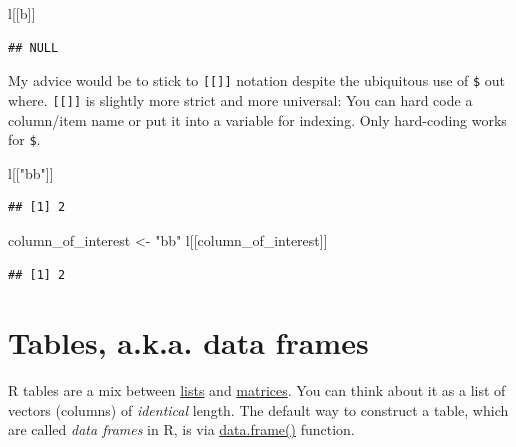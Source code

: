 \documentclass[
]{book}
\newenvironment{Shaded}{\begin{snugshade}}{\end{snugshade}}
\newcommand{\NormalTok}[1]{#1}
\newcommand{\OtherTok}[1]{\textcolor[rgb]{0.56,0.35,0.01}{#1}}
\newcommand{\StringTok}[1]{\textcolor[rgb]{0.31,0.60,0.02}{#1}}
\begin{document}
\begin{Shaded}
\begin{Highlighting}[]
\NormalTok{l[[}\StringTok{\textquotesingle{}b\textquotesingle{}}\NormalTok{]]}
\end{Highlighting}
\end{Shaded}

\begin{verbatim}
## NULL
\end{verbatim}

My advice would be to stick to \texttt{{[}{[}{]}{]}} notation despite the ubiquitous use of \texttt{\$} out where. \texttt{{[}{[}{]}{]}} is slightly more strict and more universal: You can hard code a column/item name or put it into a variable for indexing. Only hard-coding works for \texttt{\$}.

\begin{Shaded}
\begin{Highlighting}[]
\NormalTok{l[[}\StringTok{"bb"}\NormalTok{]]}
\end{Highlighting}
\end{Shaded}

\begin{verbatim}
## [1] 2
\end{verbatim}

\begin{Shaded}
\begin{Highlighting}[]
\NormalTok{column\_of\_interest }\OtherTok{\textless{}{-}} \StringTok{"bb"}
\NormalTok{l[[column\_of\_interest]]}
\end{Highlighting}
\end{Shaded}

\begin{verbatim}
## [1] 2
\end{verbatim}

\hypertarget{data.frame}{%
\section{Tables, a.k.a. data frames}\label{data.frame}}

R tables are a mix between \href{https://stat.ethz.ch/R-manual/R-devel/library/base/html/list.html}{lists} and \href{https://stat.ethz.ch/R-manual/R-devel/library/base/html/matrix.html}{matrices}. You can think about it as a list of vectors (columns) of \emph{identical} length. The default way to construct a table, which are called \emph{data frames} in R, is via \href{https://www.rdocumentation.org/packages/base/versions/3.6.2/topics/data.frame}{data.frame()} function.
\end{document}
